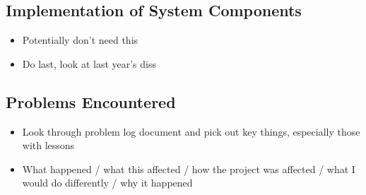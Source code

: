\subsection{Implementation of System Components}
{\color{red}
	\begin{itemize}
		\item Potentially don't need this
		\item Do last, look at last year's diss
	\end{itemize}
}


\subsection{Problems Encountered}
{\color{red}
	\begin{itemize}
		\item Look through problem log document and pick out key things, especially those with lessons
		\item What happened / what this affected / how the project was affected / what I would do differently / why it happened
	\end{itemize}
}